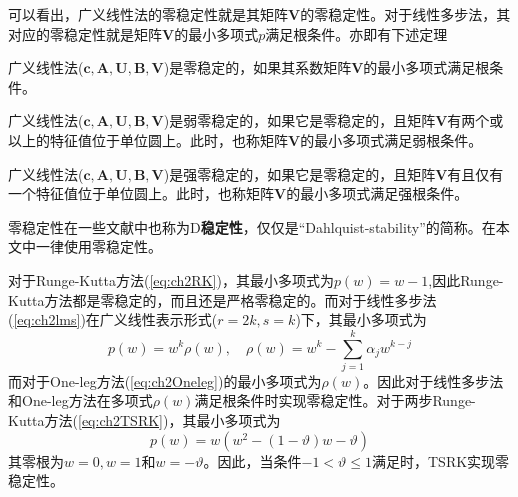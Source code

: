 可以看出，广义线性法的零稳定性就是其矩阵$\bm{V}$的零稳定性。对于线性多步法，其对应的零稳定性就是矩阵$\bm{V}$的最小多项式$p$满足根条件。亦即有下述定理
\begin{theorem}[零稳定性的等价转述]
广义线性法($\bm{c},\bm{A},\bm{U},\bm{B},\bm{V}$)是零稳定的\cite{Jackiewicz2009}，如果其系数矩阵$\bm{V}$的最小多项式满足根条件。
\end{theorem}
\begin{definition}[弱零稳定性]
广义线性法($\bm{c},\bm{A},\bm{U},\bm{B},\bm{V}$)是弱零稳定的\cite{Gear1971a}，如果它是零稳定的，且矩阵$\bm{V}$有两个或以上的特征值位于单位圆上。此时，也称矩阵$\bm{V}$的最小多项式满足弱根条件。
\end{definition}
\begin{definition}[强零稳定性]
广义线性法($\bm{c},\bm{A},\bm{U},\bm{B},\bm{V}$)是强零稳定的\cite{Jackiewicz2009,李寿佛2010,Gear1971a}，如果它是零稳定的，且矩阵$\bm{V}$有且仅有一个特征值位于单位圆上。此时，也称矩阵$\bm{V}$的最小多项式满足强根条件。
\end{definition}%

零稳定性在一些文献中也称为D\textbf{稳定性}，仅仅是“Dahlquist-stability”的简称。在本文中一律使用零稳定性。 

对于Runge-Kutta方法(\ref{eq:ch2RK})，其最小多项式为$p(w)=w-1$,因此Runge-Kutta方法都是零稳定的，而且还是严格零稳定的。而对于线性多步法(\ref{eq:ch2lms})在广义线性表示形式($r=2k,s=k$)下，其最小多项式为
\begin{equation}
p(w)=w^k\rho(w),\quad \rho(w)=w^k-\sum_{j=1}^{k}\alpha_jw^{k-j}
\end{equation}
而对于One-leg方法(\ref{eq:ch2Oneleg})的最小多项式为$\rho(w)$。因此对于线性多步法和One-leg方法在多项式$\rho(w)$满足根条件时实现零稳定性。对于两步Runge-Kutta方法(\ref{eq:ch2TSRK})，其最小多项式为
\begin{equation}
p(w)=w(w^2-(1-\vartheta)w-\vartheta)
\end{equation}
其零根为$w=0,w=1$和$w=-\vartheta$。因此，当条件$-1<\vartheta\le1$满足时，TSRK实现零稳定性。

